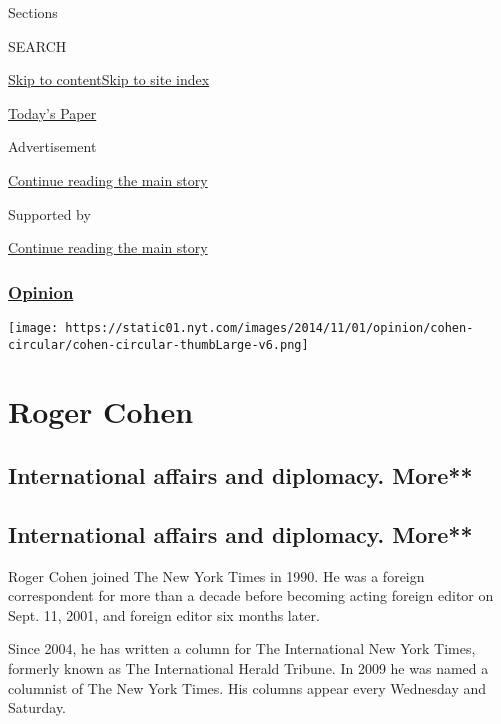Sections

SEARCH

\protect\hyperlink{site-content}{Skip to
content}\protect\hyperlink{site-index}{Skip to site index}

\href{https://myaccount.nytimes.com/auth/login?response_type=cookie\&client_id=vi}{}

\href{https://www.nytimes.com/section/todayspaper}{Today's Paper}

Advertisement

\protect\hyperlink{after-top}{Continue reading the main story}

Supported by

\protect\hyperlink{after-sponsor}{Continue reading the main story}

\hypertarget{opinion}{%
\subsubsection{\texorpdfstring{\href{/section/opinion}{Opinion}}{Opinion}}\label{opinion}}

\texttt{[image: https://static01.nyt.com/images/2014/11/01/opinion/cohen-circular/cohen-circular-thumbLarge-v6.png]}

\hypertarget{roger-cohen}{%
\section{Roger Cohen}\label{roger-cohen}}

\hypertarget{international-affairs-and-diplomacy-more}{%
\subsection{International affairs and diplomacy.
More**}\label{international-affairs-and-diplomacy-more}}

\hypertarget{international-affairs-and-diplomacy-more-1}{%
\subsection{International affairs and diplomacy.
More**}\label{international-affairs-and-diplomacy-more-1}}

Roger Cohen joined The New York Times in 1990. He was a foreign
correspondent for more than a decade before becoming acting foreign
editor on Sept. 11, 2001, and foreign editor six months later.

Since 2004, he has written a column for The International New York
Times, formerly known as The International Herald Tribune. In 2009 he
was named a columnist of The New York Times. His columns appear every
Wednesday and Saturday.


